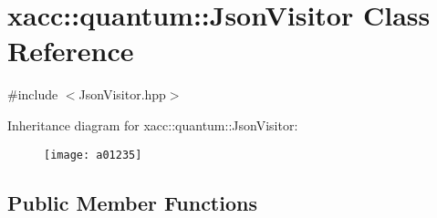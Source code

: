 \hypertarget{a01235}{}\section{xacc\+:\+:quantum\+:\+:Json\+Visitor Class Reference}
\label{a01235}


{\ttfamily \#include $<$Json\+Visitor.\+hpp$>$}

Inheritance diagram for xacc\+:\+:quantum\+:\+:Json\+Visitor\+:\begin{figure}[H]
\begin{center}
\leavevmode
\texttt{[image: a01235]}
\end{center}
\end{figure}
\subsection*{Public Member Functions}
